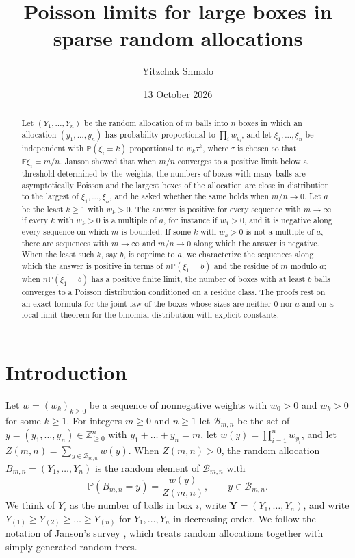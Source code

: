 \documentclass[11pt]{amsart}
\title[Poisson limits in sparse random allocations]{Poisson limits for large boxes in sparse random allocations}
\author{Yitzchak Shmalo}
\date{13 October 2026}
\theoremstyle{definition}
\theoremstyle{remark}
\numberwithin{equation}{section}
\newcommand{\Pp}{\mathbb P}
\newcommand{\E}{\mathbb E}
\newcommand{\Z}{\mathbb Z}
\newcommand{\cB}{\mathcal B}
\newcommand{\bY}{\mathbf Y}
\begin{document}
\begin{abstract}
Let $(Y_1,\dots,Y_n)$ be the random allocation of $m$ balls into $n$ boxes in which an allocation $(y_1,\dots,y_n)$ has probability proportional to $\prod_iw_{y_i}$, and let $\xi_1,\dots,\xi_n$ be independent with $\Pp(\xi_i=k)$ proportional to $w_k\tau^k$, where $\tau$ is chosen so that $\E\xi_i=m/n$. Janson showed that when $m/n$ converges to a positive limit below a threshold determined by the weights, the numbers of boxes with many balls are asymptotically Poisson and the largest boxes of the allocation are close in distribution to the largest of $\xi_1,\dots,\xi_n$, and he asked whether the same holds when $m/n\to0$. Let $a$ be the least $k\ge1$ with $w_k>0$. The answer is positive for every sequence with $m\to\infty$ if every $k$ with $w_k>0$ is a multiple of $a$, for instance if $w_1>0$, and it is negative along every sequence on which $m$ is bounded. If some $k$ with $w_k>0$ is not a multiple of $a$, there are sequences with $m\to\infty$ and $m/n\to0$ along which the answer is negative. When the least such $k$, say $b$, is coprime to $a$, we characterize the sequences along which the answer is positive in terms of $n\Pp(\xi_1=b)$ and the residue of $m$ modulo $a$; when $n\Pp(\xi_1=b)$ has a positive finite limit, the number of boxes with at least $b$ balls converges to a Poisson distribution conditioned on a residue class. The proofs rest on an exact formula for the joint law of the boxes whose sizes are neither $0$ nor $a$ and on a local limit theorem for the binomial distribution with explicit constants.
\end{abstract}
\maketitle

\section{Introduction}\label{sec:intro}

Let $w=(w_k)_{k\ge0}$ be a sequence of nonnegative weights with $w_0>0$ and $w_k>0$ for some $k\ge1$. For integers $m\ge0$ and $n\ge1$ let $\cB_{m,n}$ be the set of $y=(y_1,\dots,y_n)\in\Z_{\ge0}^n$ with $y_1+\dots+y_n=m$, let $w(y)=\prod_{i=1}^nw_{y_i}$, and let $Z(m,n)=\sum_{y\in\cB_{m,n}}w(y)$. When $Z(m,n)>0$, the random allocation $B_{m,n}=(Y_1,\dots,Y_n)$ is the random element of $\cB_{m,n}$ with
\[
\Pp(B_{m,n}=y)=\frac{w(y)}{Z(m,n)},\qquad y\in\cB_{m,n}.
\]
We think of $Y_i$ as the number of balls in box $i$, write $\bY=(Y_1,\dots,Y_n)$, and write $Y_{(1)}\ge Y_{(2)}\ge\dots\ge Y_{(n)}$ for $Y_1,\dots,Y_n$ in decreasing order. We follow the notation of Janson's survey \cite{J12}, which treats random allocations together with simply generated random trees.
\end{document}
